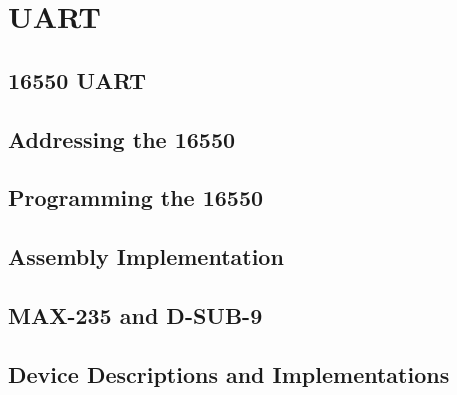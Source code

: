 \newpage
\section{UART}

    \subsection{16550 UART}

    \subsection{Addressing the 16550}

    \subsection{Programming the 16550}

    \subsection{Assembly Implementation}

    \subsection{MAX-235 and D-SUB-9}

    \subsection{Device Descriptions and Implementations}